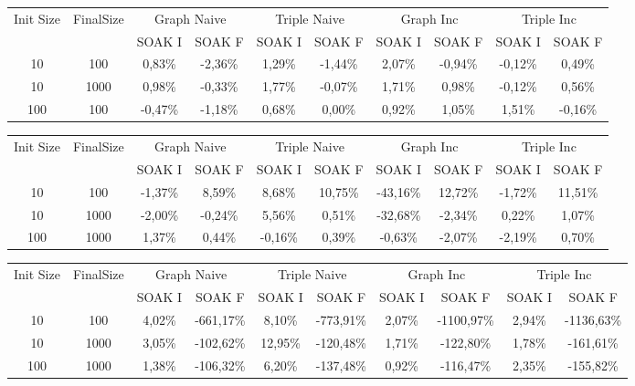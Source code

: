 \begin{sidewaystable}
	\centering
	\scriptsize
	\begin{tabular}{|c|c|cc|cc|cc|cc|} %
	  	\hline
		Init Size&FinalSize &\multicolumn{2}{c}{Graph Naive}  &\multicolumn{2}{c}{Triple Naive}&\multicolumn{2}{c}{Graph Inc}  &\multicolumn{2}{c}{Triple Inc}\\\
		&& SOAK I & SOAK F& SOAK I & SOAK F& SOAK I & SOAK F& SOAK I & SOAK F\\
		\hline
		\hline
		10&100&0,83\%&	-2,36\%&	1,29\%&	-1,44\%&	2,07\%&	-0,94\%&	-0,12\%&	0,49\%\\	
		10&1000&0,98\%&	-0,33\%&	1,77\%&	-0,07\%&	1,71\%&	0,98\%&	-0,12\%&	0,56\%\\
	
		100&100&	-0,47\%&	-1,18\%&	0,68\%&	0,00\%&	0,92\%&	1,05\%&	1,51\%&	-0,16\%\\
		\hline %
	\end{tabular}
	\caption[\textsc{Analyser} Investigation Stack - Level 1 - SOAK Test Average Latency Comparison]{Mean Latency Comparison Step Response}
	\label{tab:step_latency_comparisons_mean}	

	
	
	\begin{tabular}{|c|c|cc|cc|cc|cc|} %
	  	\hline
		Init Size&FinalSize &\multicolumn{2}{c}{Graph Naive}  &\multicolumn{2}{c}{Triple Naive}&\multicolumn{2}{c}{Graph Inc}  &\multicolumn{2}{c}{Triple Inc}\\\
		&& SOAK I & SOAK F& SOAK I & SOAK F& SOAK I & SOAK F& SOAK I & SOAK F\\
		\hline
		10&	100	& -1,37\%&	8,59\%&	8,68\%&	10,75\%&	-43,16\%&	12,72\%&	-1,72\%&	11,51\%	\\
		10	&1000	&-2,00\%&	-0,24\%&	5,56\%&	0,51\%&	-32,68\%&	-2,34\%&	0,22\%&	1,07\%	\\
		100	&1000&	1,37\%&	0,44\%&	-0,16\%&	0,39\%&	-0,63\%&	-2,07\%&	-2,19\%&	0,70\%	\\
										
		\hline %
	\end{tabular}
	\caption[\textsc{Analyser} Investigation Stack - Level 1 - SOAK Test Average Latency Comparison]{Mean Memory Comparison Step Response}
	\label{tab:step_memory_comparisons_mean}


	\begin{tabular}{|c|c|cc|cc|cc|cc|} %
	  	\hline
		Init Size&FinalSize &\multicolumn{2}{c}{Graph Naive}  &\multicolumn{2}{c}{Triple Naive}&\multicolumn{2}{c}{Graph Inc}  &\multicolumn{2}{c}{Triple Inc}\\\
		&& SOAK I & SOAK F& SOAK I & SOAK F& SOAK I & SOAK F& SOAK I & SOAK F\\
		\hline
		\hline
		10	&100	&4,02\%&	-661,17\%&	8,10\%&	-773,91\%&	2,07\%&	-1100,97\%&	2,94\%&	-1136,63\%\\	
		10	&1000	&3,05\%&	-102,62\%&	12,95\%&	-120,48\%&	1,71\%&	-122,80\%&	1,78\%&	-161,61\%	\\
		100	&1000&	1,38\%&	-106,32\%&	6,20\%&	-137,48\%&	0,92\%&	-116,47\%&	2,35\%&	-155,82\%	\\


\end{tabular}
\end{sidewaystable}
